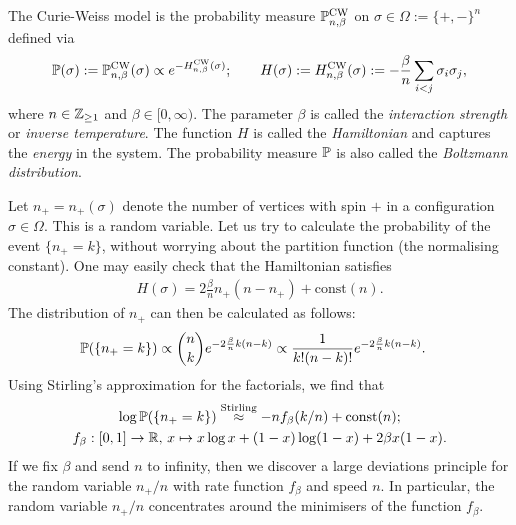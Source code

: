 \begin{definition}
    The Curie-Weiss model is the probability measure $\P^{\operatorname{CW}}_{n,\beta}$
    on $\sigma\in\Omega:=\{+,-\}^n$
    defined via
    \[
        \P(\sigma):=\P^{\operatorname{CW}}_{n,\beta}(\sigma)
        \propto
        e^{-H^{\operatorname{CW}}_{n,\beta}(\sigma)}
        ;
        \qquad
        H(\sigma):=H^{\operatorname{CW}}_{n,\beta}(\sigma):=
        -\frac\beta{n} \sum_{i<j}\sigma_i\sigma_j,
    \]
    where $n\in\Z_{\geq 1}$ and $\beta\in[0,\infty)$.
    The parameter $\beta$ is called the \emph{interaction strength} or \emph{inverse temperature}.
    The function $H$ is called the \emph{Hamiltonian} and captures the \emph{energy} in the system.
    The probability measure $\P$ is also called the \emph{Boltzmann distribution}.
\end{definition}

Let $n_+=n_+(\sigma)$ denote the number of vertices with spin $+$ in a configuration $\sigma\in\Omega$.
This is a random variable.
Let us try to calculate the probability of the event $\{n_+=k\}$,
without worrying about the partition function (the normalising constant).
One may easily check that
the Hamiltonian satisfies
\begin{align}
    H(\sigma)=2\frac\beta{n} n_+(n-n_+) + \text{const}(n).
\end{align}
The distribution of $n_+$ can then be calculated as follows:
\begin{align}
    \label{eq:CurieWeissDistribution}
    \P(\{n_+ = k\}) &\propto \binom{n}{k} e^{-2\frac\beta{n}  k(n-k)}
    \propto \frac1{k! (n-k)!} e^{-2\frac\beta{n} k (n-k)}.
\end{align}
Using Stirling's approximation for the factorials, we find that
\begin{gather}
    \log\P(\{n_+ = k\})
    \stackrel{\text{Stirling}}{\approx}
    -n f_{\beta}(k/n) + \text{const}(n);
    \\
    f_{\beta}:[0,1]\to\R,\,
    x\mapsto x \log x + (1-x)\log (1-x) + 2 \beta x (1-x).
\end{gather}
If we fix $\beta$ and send $n$ to infinity, then 
we discover a large deviations principle for the random variable $n_+/n$
with rate function $f_{\beta}$ and speed $n$.
In particular, the random variable $n_+/n$ concentrates
around the minimisers of the function $f_{\beta}$.

